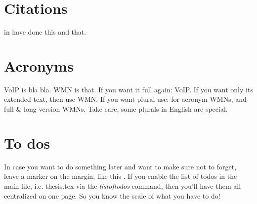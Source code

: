 
\section{Citations}
\label{sec:citations}
\citeauthor{einstein1905electrodynamics} in \cite{einstein1905electrodynamics} have done this and that.

\section{Acronyms}
\label{sec:acronyms}
\ac{VoIP} is bla bla. \ac{WMN} is that. If you want it full again: \acf{VoIP}. If you want only its extended text, then use \acl{WMN}. If you want plural use: for acronym \acp{WMN}, and full \& long version \aclp{WMN}. Take care, some plurals in English are special.

\section{To dos}
\label{sec:to_dos}
In case you want to do something later and want to make sure not to forget, leave a marker on the margin, like this . If you enable the list of todos in the main file, i.e. thesis.tex via the \emph{listoftodos} command, then you'll have them all centralized on one page. So you know the scale of what you have to do!

